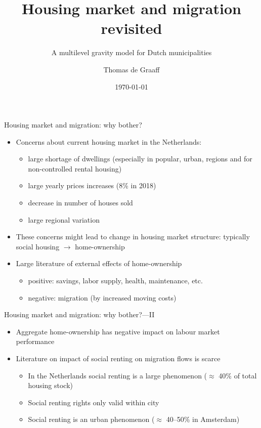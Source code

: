 \documentclass{beamer}
\title{Housing market and migration revisited}
\subtitle{A multilevel gravity model for Dutch municipalities}
\date{\today}
\author{Thomas de Graaff}
\institute{Vrije Universiteit Amsterdam\\Department of Spatial Economics}
\begin{document}
\maketitle

\begin{frame}{Housing market and migration: why bother?}
   	\begin{itemize}
   		\item \alert{Concerns} about current housing market in the Netherlands:
   		\begin{itemize}
   			\item large \alert{shortage} of dwellings (especially in popular, urban, regions and for non-controlled rental housing)
   			\item large yearly prices \alert{increases} (8\% in 2018)
   			\item decrease in number of houses \alert{sold}
   			\item large \alert{regional} variation\newline
   		\end{itemize}
   		\item These concerns might lead to change in housing market \alert{structure}: typically social housing $\longrightarrow$ home-ownership
   		\newline
   		\item Large literature of \alert{external} effects of home-ownership \citep{dietz2003social}
   		\begin{itemize}
   			\item \alert{positive}: savings, labor supply, health, maintenance, etc.
   			\item \alert{negative}: migration (by increased moving costs) 
   		\end{itemize}
   	\end{itemize}
\end{frame}

\begin{frame}{Housing market and migration: why bother?---II}
\begin{itemize}
	\item Aggregate home-ownership has negative impact on labour market performance \citep{oswald1996conjecture,oswald1999housing}
	\newline
	\item Literature on impact of social renting on migration flows is scarce \citep{de2009homeownership}
	\begin{itemize}
		\item In the Netherlands social renting is a large phenomenon ($\approx$ 40\% of total housing stock)
		\item Social renting rights only valid \alert{within} city \citep{boyle1998migration}
		\item Social renting is an \alert{urban} phenomenon ($\approx$ 40--50\% in Amsterdam)
	\end{itemize}
\end{itemize}
\end{frame}
\end{document}
